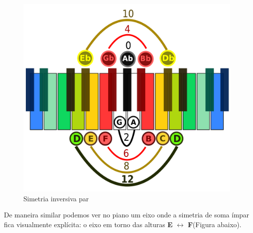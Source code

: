 \documentclass[
	12pt,				%
	openright,			%
	twoside,			%
	a4paper,			%
	english,			%
	french,				%
	spanish,			%
	brazil				%
	]{abntex2}
\begin{document}
\begin{figure}[!h]
	\caption{\label{fig_grafico}Simetria inversiva par}
	\begin{center}
	    \includegraphics[scale=0.3]{axis/simetriainversiva_par.pdf}
	\end{center}
\end{figure}

De maneira similar podemos ver no piano um eixo onde a simetria de soma ímpar fica visualmente explícita: o eixo em torno das alturas \textbf{E} $\leftrightarrow $  \textbf{F}(Figura abaixo).
\end{document}
